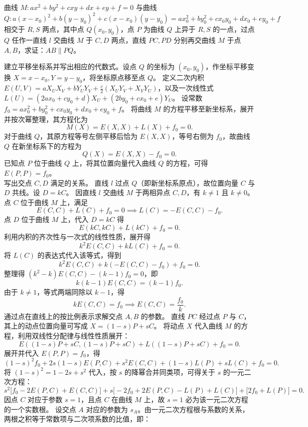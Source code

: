 \begin{example}
曲线 \(M: ax^2 + by^2 + cxy + dx + ey + f = 0\) 与曲线 \(Q: a(x-x_0)^2 + b(y-y_0)^2 + c(x-x_0)(y-y_0) = ax_0^2 + by_0^2 + cx_0y_0 + dx_0 + ey_0 + f\) 相交于 \(R,S\) 两点，其中点 \(Q(x_0,y_0)\)，点 \(P\) 为曲线 \(Q\) 上异于 \(R,S\) 的一点，过点 \(Q\) 任作一直线 \(l\) 交曲线 \(M\) 于 \(C,D\) 两点，直线 \(PC,PD\) 分别再交曲线 \(M\) 于点 \(A,B\)，求证：\(AB \parallel PQ\)。
\end{example}
\begin{solution}
建立平移坐标系并写出相应的代数式。设点 $Q$ 的坐标为 $(x_0, y_0)$，作坐标平移变换 $X = x - x_0, Y = y - y_0$，将坐标原点移至点 $Q$。
定义二次内积 $E(U,V) = a X_U X_V + b Y_U Y_V + \frac{c}{2}(X_U Y_V + X_V Y_U)$，以及一次线性式 $L(U) = (2ax_0 + cy_0 + d)X_U + (2by_0 + cx_0 + e)Y_U$。
设常数 $f_0 = ax_0^2 + by_0^2 + cx_0y_0 + dx_0 + ey_0 + f$。
将曲线 $M$ 的方程平移至新坐标系，展开并按次幂整理，其方程化为
\[ M(X) = E(X,X) + L(X) + f_0 = 0. \]
对于曲线 $Q$，其原方程等号左侧平移后恰为 $E(X,X)$，等号右侧为 $f_0$，故曲线 $Q$ 在新坐标系下的方程为
\[ Q(X) = E(X,X) - f_0 = 0. \]
已知点 $P$ 位于曲线 $Q$ 上，将其位置向量代入曲线 $Q$ 的方程，可得 $E(P,P) = f_0$。\\
写出交点 $C, D$ 满足的关系。
直线 $l$ 过点 $Q$（即新坐标系原点），故位置向量 $C$ 与 $D$ 共线。设 $D = kC$。
因直线 $l$ 交曲线 $M$ 于两相异点 $C, D$，有 $k \neq 1$ 且 $k \neq 0$。
点 $C$ 位于曲线 $M$ 上，满足
\[ E(C,C) + L(C) + f_0 = 0 \implies L(C) = -E(C,C) - f_0. \]
点 $D$ 位于曲线 $M$ 上，代入 $D = kC$ 得
\[ E(kC,kC) + L(kC) + f_0 = 0. \]
利用内积的齐次性与一次式的线性性质，展开得
\[ k^2 E(C,C) + k L(C) + f_0 = 0. \]
将 $L(C)$ 的表达式代入该等式，得到
\[ k^2 E(C,C) + k(-E(C,C) - f_0) + f_0 = 0. \]
整理得 $(k^2 - k)E(C,C) - (k - 1)f_0 = 0$，即
\[ k(k-1)E(C,C) = (k-1)f_0. \]
由于 $k \neq 1$，等式两端同除以 $k-1$，得
\[ k E(C,C) = f_0 \implies E(C,C) = \frac{f_0}{k}. \]
通过点在直线上的按比例表示求解交点 $A, B$ 的参数。
直线 $PC$ 经过点 $P$ 与 $C$，其上的动点位置向量可写成 $X = (1-s)P + s C$。
将动点 $X$ 代入曲线 $M$ 的方程，利用双线性分配律与线性性质展开：
\[ E((1-s)P + s C, (1-s)P + s C) + L((1-s)P + s C) + f_0 = 0. \]
展开并代入 $E(P,P) = f_0$，得
\[ (1-s)^2 f_0 + 2s(1-s)E(P,C) + s^2 E(C,C) + (1-s)L(P) + s L(C) + f_0 = 0. \]
将 $(1-s)^2 = 1 - 2s + s^2$ 代入，按 $s$ 的降幂合并同类项，可得关于 $s$ 的一元二次方程：
\[ s^2 \big[ f_0 - 2E(P,C) + E(C,C) \big] + s \big[ -2f_0 + 2E(P,C) - L(P) + L(C) \big] + \big[ 2f_0 + L(P) \big] = 0. \]
因点 $C$ 对应于参数 $s = 1$，且点 $C$ 在曲线 $M$ 上，故 $s = 1$ 必为该一元二次方程的一个实数根。
设交点 $A$ 对应的参数为 $s_A$。由一元二次方程根与系数的关系，两根之积等于常数项与二次项系数的比值，即：

\end{solution}
